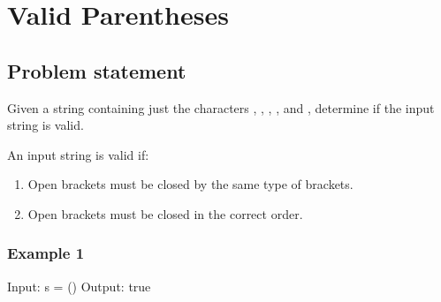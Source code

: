 \documentclass[letterpaper,12pt,english]{book}
\begin{document}
\sphinxstepscope


\section{Valid Parentheses}
\label{\detokenize{Stack/20_Valid_Parentheses:valid-parentheses}}\label{\detokenize{Stack/20_Valid_Parentheses::doc}}

\subsection{Problem statement\sphinxfootnotemark[47]}
\label{\detokenize{Stack/20_Valid_Parentheses:problem-statement}}%
\begin{footnotetext}[47]\sphinxAtStartFootnote
{}
%
\end{footnotetext}\ignorespaces 
\sphinxAtStartPar
Given a string  containing just the characters \sphinxcode{\sphinxupquote{\textquotesingle{}(\textquotesingle{}}}, \sphinxcode{\sphinxupquote{\textquotesingle{})\textquotesingle{}}}, \sphinxcode{\sphinxupquote{\textquotesingle{}\{\textquotesingle{}}}, \sphinxcode{\sphinxupquote{\textquotesingle{}\}\textquotesingle{}}}, \sphinxcode{\sphinxupquote{\textquotesingle{}{[}\textquotesingle{}}} and \sphinxcode{\sphinxupquote{\textquotesingle{}{]}\textquotesingle{}}}, determine if the input string is valid.

\sphinxAtStartPar
An input string is valid if:
\begin{enumerate}
%
\item {} 
\sphinxAtStartPar
Open brackets must be closed by the same type of brackets.

\item {} 
\sphinxAtStartPar
Open brackets must be closed in the correct order.

\end{enumerate}


\subsubsection{Example 1}
\label{\detokenize{Stack/20_Valid_Parentheses:example-1}}
\begin{sphinxVerbatim}[commandchars=\\\{\}]
Input: s = \PYGZdq{}()\PYGZdq{}
Output: true
\end{sphinxVerbatim}
\end{document}

